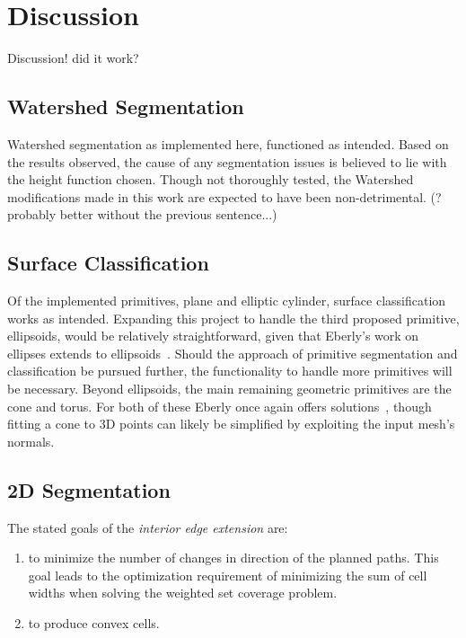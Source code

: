 \chapter{Discussion}
Discussion! did it work?

\section{Watershed Segmentation}
Watershed segmentation as implemented here, functioned as intended.
Based on the results observed, the cause of any segmentation issues is believed to lie with the height function chosen.
Though not thoroughly tested, the Watershed modifications made in this work are expected to have been non-detrimental.
(? probably better without the previous sentence...)

\section{Surface Classification}
Of the implemented primitives, plane and elliptic cylinder, surface classification works as intended.
Expanding this project to handle the third proposed primitive, ellipsoids, would be relatively straightforward, given that Eberly's work on ellipses extends to ellipsoids~\cite{GeoTools_pt_to_ellipse}.
Should the approach of primitive segmentation and classification be pursued further, the functionality to handle more primitives will be necessary.
Beyond ellipsoids, the main remaining geometric primitives are the cone and torus.
For both of these Eberly once again offers solutions~\cite{GeoTools_least_squares_fitting}, though fitting a cone to 3D points can likely be simplified by exploiting the input mesh's normals.

\section{2D Segmentation}
The stated goals of the \textit{interior edge extension}\cite{IntEdgeExt} are:
\begin{enumerate}
	\item to minimize the number of changes in direction of the planned paths.
		This goal leads to the optimization requirement of minimizing the sum of cell widths when solving the weighted set coverage problem.
	\item to produce convex cells.
\end{enumerate}

